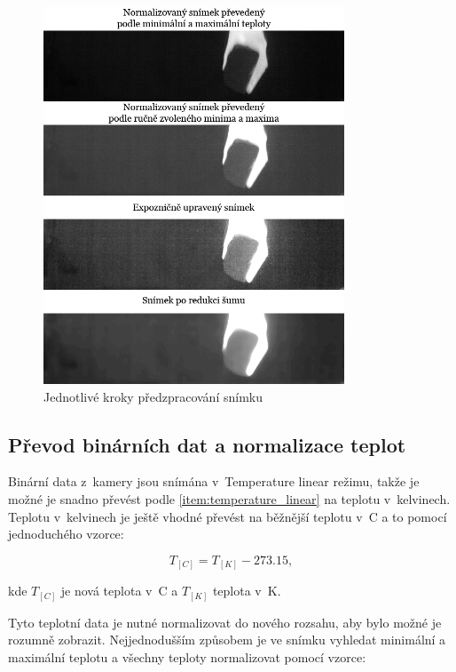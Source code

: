 \begin{figure}[h]
  \centering
  \includegraphics[width=0.8\textwidth]{images/camera_2_image_preprocessing.png}
  \caption{Jednotlivé kroky předzpracování snímku}
  \label{fig:camera_2_image_preprocessing}
\end{figure} 

	\subsection{Převod binárních dat a normalizace teplot}
    Binární data z~kamery jsou snímána v~Temperature linear režimu, takže je možné je snadno převést podle \ref{item:temperature_linear} na teplotu v~kelvinech. Teplotu v~kelvinech je ještě vhodné převést na běžnější teplotu v~\textdegree{}C a to pomocí jednoduchého vzorce:
    
    \begin{equation}
 	   T_{[C]}= T_{[K]} - 273.15,  
    \end{equation}
    
	kde $T_{[C]}$ je nová teplota v~\textdegree{}C a $T_{[K]}$ teplota v~K.
    
    Tyto teplotní data je nutné normalizovat do nového rozsahu, aby bylo možné je rozumně zobrazit. Nejjednodušším způsobem je ve snímku vyhledat minimální a maximální teplotu a všechny teploty normalizovat pomocí vzorce:
    
